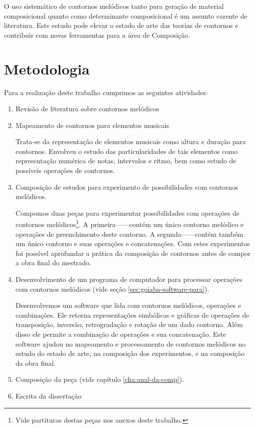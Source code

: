 O uso sistemático de contornos melódicos tanto para geração de
material composicional quanto como determinante composicional é um
assunto carente de literatura. Este estudo pode elevar o estado de
arte das teorias de contornos e contribuir com novas ferramentas para
a área de Composição.

\section{Metodologia}
\label{sec:metodologia}

Para a realização deste trabalho cumprimos as seguintes atividades:

\begin{enumerate}
\item Revisão de literatura sobre contornos melódicos

\item Mapeamento de contornos para elementos musicais

  Trata-se da representação de elementos musicais como altura e
  duração para contornos. Envolveu o estudo das particularidades de
  tais elementos como representação numérica de notas, intervalos e
  ritmo, bem como estudo de possíveis operações de contornos.

\item Composição de estudos para experimento de possibilidades com
  contornos melódicos.

  Compomos duas peças para experimentar possibilidades com operações
  de contornos melódicos\footnote{Vide partituras destas peças nos
    anexos deste trabalho.}. A primeira------contém um único contorno melódico e
  operações de preenchimento deste contorno. A segunda------contém também um único contorno e suas operações
  e concatenações. Com estes experimentos foi possível aprofundar a
  prática da composição de contornos antes de compor a obra final do
  mestrado.

\item Desenvolvimento de um programa de computador para processar
  operações com contornos melódicos (vide seção
  \ref{sec:goiaba-software-para}).

  Desenvolvemos um software que lida com contornos melódicos,
  operações e combinações. Ele retorna representações simbólicas e
  gráficas de operações de transposição, inversão, retrogradação e
  rotação de um dado contorno. Além disso ele permite a combinação de
  operações e sua concatenação. Este software ajudou no mapeamento e
  processamento de contornos melódicos no estudo do estado de arte, na
  composição dos experimentos, e na composição da obra final.
  
\item Composição da peça (vide capítulo \ref{cha:anal-da-comp}).

\item Escrita da dissertação
\end{enumerate}

